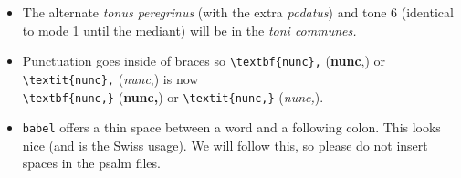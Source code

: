 \documentclass[11pt]{article}
\begin{document}
\begin{itemize}
 \item
 The alternate \textit{tonus peregrinus} (with the extra \textit{podatus}) and tone 6 (identical to mode 1 until the mediant) will be in the \textit{toni communes.}
 
  \item
 Punctuation goes inside of braces so \verb|\textbf{nunc},| (\textbf{nunc},) or \verb|\textit{nunc},| (\textit{nunc},) is now\\ \verb|\textbf{nunc,}| (\textbf{nunc,}) or \verb|\textit{nunc,}| (\textit{nunc,}).
 
 \item
\verb|babel| offers a thin space between a word and a following colon. This looks nice (and is the Swiss usage). We will follow this, so please do not insert spaces in the psalm files.
 
 \end{itemize}
\end{document}
